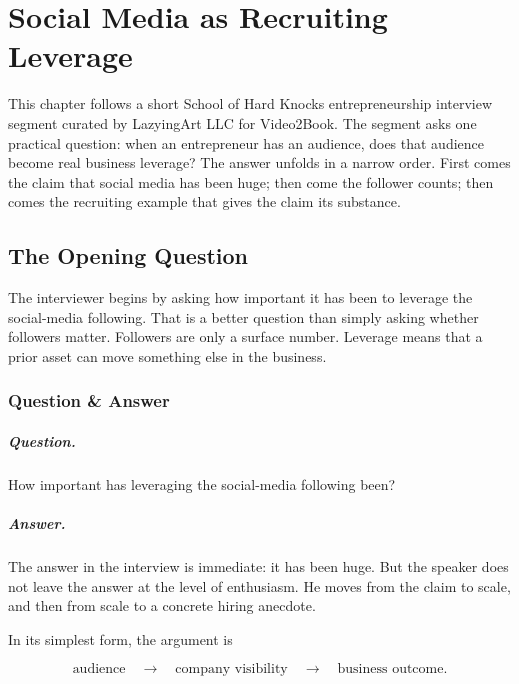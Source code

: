 \chapter{Social Media as Recruiting Leverage}

This chapter follows a short School of Hard Knocks entrepreneurship interview segment curated by LazyingArt LLC for Video2Book. The segment asks one practical question: when an entrepreneur has an audience, does that audience become real business leverage? The answer unfolds in a narrow order. First comes the claim that social media has been huge; then come the follower counts; then comes the recruiting example that gives the claim its substance.

\section{The Opening Question}

The interviewer begins by asking how important it has been to leverage the social-media following. That is a better question than simply asking whether followers matter. Followers are only a surface number. Leverage means that a prior asset can move something else in the business.

\subsection{Question \& Answer}

\paragraph{Question.}
How important has leveraging the social-media following been?

\paragraph{Answer.}
The answer in the interview is immediate: it has been huge. But the speaker does not leave the answer at the level of enthusiasm. He moves from the claim to scale, and then from scale to a concrete hiring anecdote.

In its simplest form, the argument is

\begin{equation}
\text{audience} \quad \longrightarrow \quad \text{company visibility} \quad \longrightarrow \quad \text{business outcome}.
\end{equation}

